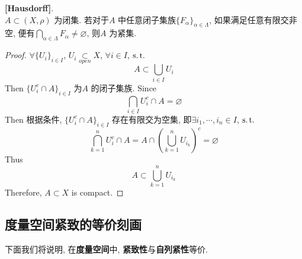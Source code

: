 	\vspace{4em}
	
	\begin{proposition}\label{prop 1.6.4}
		\textbf{[Hausdorff]}. \\
		$A \subset (X , \rho)$ 为闭集. 若对于$A$ 中任意闭子集族$\{ F_\alpha \}_{\alpha \in \Lambda}$, 如果满足任意有限交非空, 便有$\underset{\alpha \in \Lambda}{\bigcap} F_\alpha \neq \varnothing$, 则$A$ 为紧集.
		
		\vspace{2em}
		
		\begin{proof}
			$\forall \{ U_i \}_{i \in I}$, $U_i \underset{open}{\subset} X$, $\forall i \in I$, $\operatorname{s.t.}$
			\[ A \subset \bigcup_{i \in I} U_i \]
			Then $\{ U_{i}^c \cap A \}_{i \in I}$ 为$A$ 的闭子集族. Since 
			\[ \bigcap_{i \in I} U_{i}^c \cap A = \varnothing \]
			Then 根据条件, $\{ U_{i}^c \cap A \}_{i \in I}$ 存在有限交为空集, 即$\exists i_1 , \cdots , i_n \in I$, $\operatorname{s.t.}$
			\[ \bigcap_{k = 1}^{n} U_{i}^c \cap A = A \cap \left( \bigcup_{k = 1}^{n} U_{i_k} \right)^c = \varnothing \]
			Thus
			\[ A \subset \bigcup_{k = 1}^{n} U_{i_k} \]
			Therefore, $A \subset X$ is compact.
		\end{proof}
	\end{proposition}

\newpage

\subsection{度量空间紧致的等价刻画}
	下面我们将说明, 在\textbf{度量空间}中, \textbf{紧致性}与\textbf{自列紧性}等价.
	
